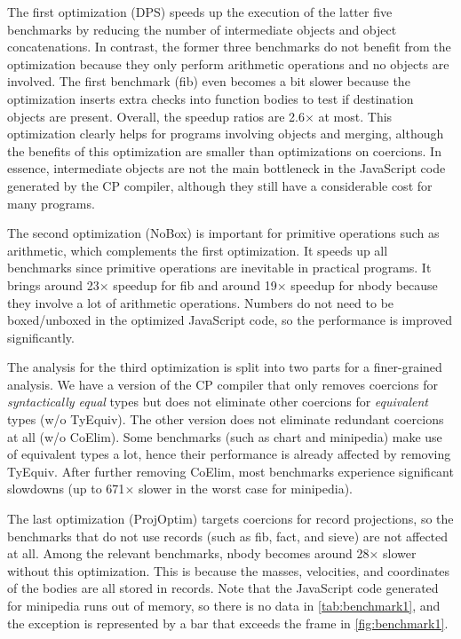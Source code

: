 The first optimization (\textsf{DPS}) speeds up the execution of the latter five
benchmarks by reducing the number of intermediate objects and object
concatenations. In contrast, the former three benchmarks do not benefit from the
optimization because they only perform arithmetic operations and no objects are
involved. The first benchmark (\textsf{fib}) even becomes a bit slower because
the optimization inserts extra checks into function bodies to test if
destination objects are present. Overall, the speedup ratios are 2.6$\times$ at
most. This optimization clearly helps for programs involving objects and
merging, although the benefits of this optimization are smaller than
optimizations on coercions. In essence, intermediate objects are not the main
bottleneck in the JavaScript code generated by the CP compiler, although they
still have a considerable cost for many programs.

The second optimization (\textsf{NoBox}) is important for primitive operations
such as arithmetic, which complements the first optimization. It speeds up all
benchmarks since primitive operations are inevitable in practical programs. It
brings around 23$\times$ speedup for \textsf{fib} and around 19$\times$ speedup
for \textsf{nbody} because they involve a lot of arithmetic operations. Numbers
do not need to be boxed/unboxed in the optimized JavaScript code, so the
performance is improved significantly.


The analysis for the third optimization is split into two parts for a
finer-grained analysis. We have a version of the CP compiler that only removes
coercions for \emph{syntactically equal} types but does not eliminate other
coercions for \emph{equivalent} types (\textsf{w/o TyEquiv}). The other version
does not eliminate redundant coercions at all (\textsf{w/o CoElim}). Some
benchmarks (such as \textsf{chart} and \textsf{minipedia}) make use of
equivalent types a lot, hence their performance is already affected by removing
\textsf{TyEquiv}. After further removing \textsf{CoElim}, most benchmarks
experience significant slowdowns (up to 671$\times$ slower in the worst case for
\textsf{minipedia}).

The last optimization (\textsf{ProjOptim}) targets coercions for record
projections, so the benchmarks that do not use records (such as \textsf{fib},
\textsf{fact}, and \textsf{sieve}) are not affected at all. Among the relevant
benchmarks, \textsf{nbody} becomes around 28$\times$ slower without this
optimization. This is because the masses, velocities, and coordinates of the
bodies are all stored in records. Note that the JavaScript code generated for
\textsf{minipedia} runs out of memory, so there is no data in
\autoref{tab:benchmark1}, and the exception is represented by a bar that exceeds
the frame in \autoref{fig:benchmark1}.

